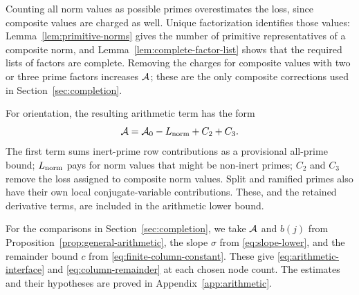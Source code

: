 Counting all norm values as possible primes overestimates the loss,
since composite values are charged as well. Unique factorization
identifies those values: Lemma~\ref{lem:primitive-norms} gives the number
of primitive representatives of a composite norm, and
Lemma~\ref{lem:complete-factor-list} shows that the required lists of
factors are complete. Removing the charges for composite values with two
or three prime factors increases $\mathcal A$; these are the only composite
corrections used in Section~\ref{sec:completion}.

For orientation, the resulting arithmetic term has the form
\begin{equation}\label{eq:arithmetic-parts}
 \mathcal A=\mathcal A_0-L_{\rm norm}+C_2+C_3.
\end{equation}
The first term sums inert-prime row contributions as a provisional all-prime bound; $L_{\rm norm}$ pays for norm values that might be non-inert primes; $C_2$ and $C_3$ remove the loss assigned to composite norm values. Split and ramified primes also have their own local conjugate-variable contributions. These, and the retained derivative terms, are included in the arithmetic lower bound.

For the comparisons in Section~\ref{sec:completion}, we take $\mathcal A$ and
$b(j)$ from Proposition~\ref{prop:general-arithmetic}, the slope $\sigma$
from \eqref{eq:slope-lower}, and the remainder bound $c$ from
\eqref{eq:finite-column-constant}. These give
\eqref{eq:arithmetic-interface} and \eqref{eq:column-remainder} at each
chosen node count. The estimates and their hypotheses are proved in
Appendix~\ref{app:arithmetic}.
